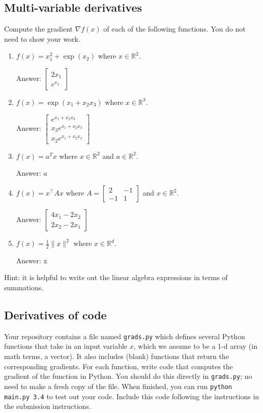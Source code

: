 \documentclass{article}
\def\ans#1{\par\gre{Answer: #1}}
\def\blu#1{{\color{blu}#1}}
\def\gre#1{{\color{gre}#1}}
\def\norm#1{\|#1\|}
\def\R{\mathbb{R}}
\begin{document}
\clearpage

\subsection{Multi-variable derivatives}

\blu{Compute the gradient $\nabla f(x)$ of each of the following functions.} You do not need to show your work.
\begin{enumerate}
\item $f(x) = x_1^2 + \exp(x_2)$ where $x \in \R^2$.
\ans{$\left[\begin{array}{c}
  2x_1\\
  e^{x_2}
  \end{array}\right]$}
\item $f(x) = \exp(x_1 + x_2x_3)$ where $x \in \mathbb{R}^3$.
\ans{$\left[\begin{array}{c}
  e^{x_1+x_2x_3}\\
  x_3e^{x_1+x_2x_3}\\
  x_2e^{x_1+x_2x_3}
  \end{array}\right]$}
\item $f(x) = a^Tx$ where $x \in \R^2$ and $a \in \R^2$.
\ans{$a$}
\item $f(x) = x^\top A x$ where $A=\left[ \begin{array}{cc}2 & -1 \\-1 & 1 \end{array} \right]$ and $x \in \mathbb{R}^2$.
\ans{$\left[\begin{array}{c}
  4x_1-2x_2\\
  2x_2-2x_1
  \end{array}\right]$}
\item $f(x) = \frac{1}{2}\norm{x}^2$ where $x \in \R^d$.
\ans{x}
\end{enumerate}

Hint: it is helpful to write out the linear algebra expressions in terms of summations.

\clearpage

\subsection{Derivatives of code}

Your repository contains a file named \texttt{grads.py} which defines several Python functions that take in an input variable $x$, which we assume to be a 1-d array (in math terms, a vector).
It also includes (blank) functions that return the corresponding gradients.
For each function, \blu{write code that computes the gradient of the function} in Python.
You should do this directly in \texttt{grads.py}; no need to make a fresh copy of the file. When finished, you can run \texttt{python main.py 3.4} to test out your code. \blu{Include this code following the instructions in the submission instructions.}
\end{document}
